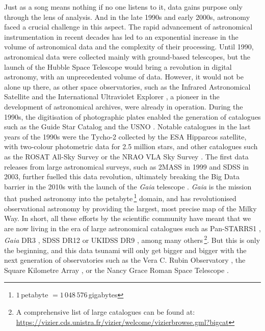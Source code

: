 Just as a song means nothing if no one listens to it, data gains purpose only through the lens of analysis. And in the late 1990s and early 2000s, astronomy faced a crucial challenge in this aspect. The rapid advancement of astronomical instrumentation in recent decades has led to an exponential increase in the volume of astronomical data and the complexity of their processing. Until 1990, astronomical data were collected mainly with ground-based telescopes, but the launch of the Hubble Space Telescope \citep{bahcall1986} would bring a revolution in digital astronomy, with an unprecedented volume of data. However, it would not be alone up there, as other space observatories, such as the Infrared Astronomical Satellite \citep{iras} and the International Ultraviolet Explorer \citep{boggess1978}, a pioneer in the development of astronomical archives, were already in operation. During the 1990s, the digitisation of photographic plates enabled the generation of catalogues such as the Guide Star Catalog \citep{lasker1990,lasker1996} and the USNO \citep{monet1998,monet2003}. Notable catalogues in the last years of the 1990s were the Tycho-2 \citep{tycho2} collected by the ESA Hipparcos satellite, with two-colour photometric data for 2.5 million stars, and other catalogues such as the ROSAT All-Sky Survey \citep{rosat} or the NRAO VLA Sky Survey \citep{nvss}. The first data releases from large astronomical surveys, such as 2MASS in 1999 and SDSS in 2003, further fuelled this data revolution, ultimately breaking the Big Data barrier in the 2010s with the launch of the \textit{Gaia} telescope \citep{gaiadr1}. \textit{Gaia} is the mission that pushed astronomy into the petabyte\,\footnote{$1$\,petabyte $ = 1\,048\,576$\,gigabytes} domain, and  has revolutionised observational astronomy by providing the largest, most precise map of the Milky Way. In short, all these efforts by the scientific community have meant that we are now living in the era of large astronomical catalogues such as Pan-STARRS1 \citep{panstarrs}, \textit{Gaia} DR3 \citep{gaiadr3}, SDSS DR12 \citep{sdssdr12} or UKIDSS DR9 \citep{ukidssdr9}, among many others\,\footnote{A comprehensive list of large catalogues can be found at: \url{https://vizier.cds.unistra.fr/vizier/welcome/vizierbrowse.gml?bigcat}}. But this is only the beginning, and this data tsunami will only get bigger and bigger with the next generation of observatories such as the Vera C. Rubin Observatory \citep{ivezic2019}, the Square Kilometre Array \citep{dewdney2009}, or the Nancy Grace Roman Space Telescope \citep{mosby2020}.

